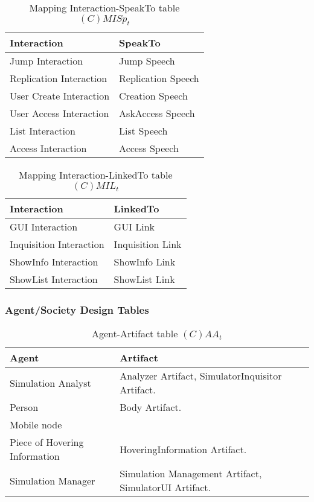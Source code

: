 \begin{table}[H]
	\centering
	\begin{tabular}{|p{4cm}|p{8cm}|}
			\hline
			\textbf{Interaction} & \textbf{SpeakTo} \\
			\hline
			Jump Interaction & Jump Speech \\
			\hline
			Replication Interaction & Replication Speech \\
			\hline
			User Create Interaction & Creation Speech \\
			\hline
			User Access Interaction & AskAccess Speech \\
			\hline
			List Interaction & List Speech \\
			\hline
			Access Interaction & Access Speech \\
			\hline
		\end{tabular}
	\caption{Mapping Interaction-SpeakTo table $(C)MISp_t$}
	\label{tab:cmispt}
\end{table}

\begin{table}[H]
	\centering
	\begin{tabular}{|p{4cm}|p{8cm}|}
			\hline
			\textbf{Interaction} & \textbf{LinkedTo} \\
			\hline
			GUI Interaction & GUI Link\\
			\hline
			Inquisition Interaction & Inquisition Link\\
			\hline
			ShowInfo Interaction & ShowInfo Link \\
			\hline
			ShowList Interaction & ShowList Link \\
			\hline
		\end{tabular}
	\caption{Mapping Interaction-LinkedTo table $(C)MIL_t$}
	\label{tab:cmilt}
\end{table}

\subsubsection{Agent/Society Design Tables}

\begin{table}[H]
	\centering
	\begin{tabular}{|p{4cm}|p{8cm}|}
			\hline
			\textbf{Agent} & \textbf{Artifact} \\
			\hline
			Simulation Analyst & Analyzer Artifact, SimulatorInquisitor Artifact. \\
			\hline
			Person & Body Artifact. \\
			\hline
			Mobile node & \\
			\hline
			Piece of Hovering Information & HoveringInformation Artifact. \\
			\hline
			Simulation Manager & Simulation Management Artifact, SimulatorUI
			Artifact. \\
			\hline
		\end{tabular}
	\caption{Agent-Artifact table $(C)AA_t$}
	\label{tab:caat}
\end{table}

